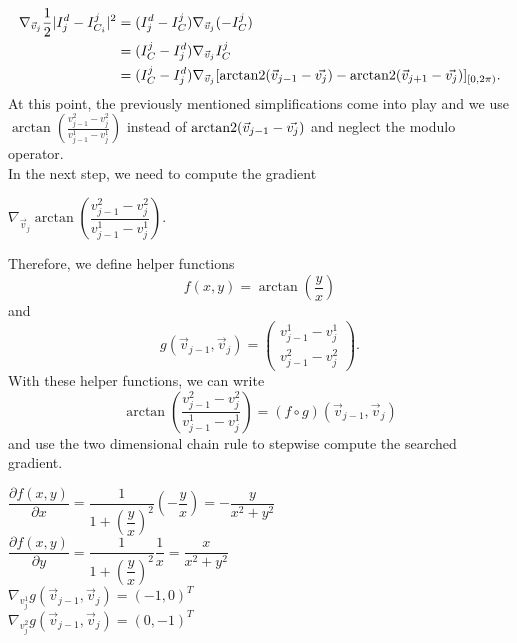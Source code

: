 \begin{proposition}
	\begin{align*}
		\nabla_{\vec{v}_j} \frac{1}{2}| I_{j}^d - I^{j}_{C_i} |^2 
		&= (I_{j}^d - I^j_{C}) \nabla_{\vec{v}_j} (- I^j_{C})\\
		&= (I^j_{C} - I_{j}^d) \nabla_{\vec{v}_j}  I^j_{C}   \\
		&= (I^j_{C} - I_{j}^d) \nabla_{\vec{v}_j} [\operatorname{arctan2}(\vec{v}_{j-1} - \vec{v_j}) - \operatorname{arctan2}(\vec{v}_{j+1} - \vec{v_j})]_{[0,2\pi)}.
	\end{align*}
	At this point, the previously mentioned simplifications come into play and we use $\arctan \left(\frac{v_{j-1}^2 - v_{j}^2}{v_{j-1}^1 - v_{j}^1} \right)$ instead of $\operatorname{arctan2}(\vec{v}_{j-1} - \vec{v_j})$ and neglect the modulo operator. \\
	In the next step, we need to compute the gradient 
	\begin{center}
		$
		\nabla_{\vec{v}_j} \arctan \left(\dfrac{v_{j-1}^2 - v_{j}^2}{v_{j-1}^1 - v_{j}^1} \right).
		$
	\end{center}
	
	Therefore, we define helper functions 
	$$ f(x,y) = \arctan \left( \frac{y}{x} \right)$$ 
	and 
	$$g(\vec{v}_{j-1}, \vec{v}_{j}) = \begin{pmatrix}
		v_{j-1}^1 - v_{j}^1 \\[0.5em] 
		v_{j-1}^2 - v_{j}^2
	\end{pmatrix}.$$
	With these helper functions, we can write 
	$$ \arctan\left(\frac{v_{j-1}^2 - v_{j}^2}{v_{j-1}^1 - v_{j}^1}\right) = (f \circ g) (\vec{v}_{j-1}, \vec{v}_{j}) $$
	and use the two dimensional chain rule to stepwise compute the searched gradient. 
 
	\begin{center}
		
		$\dfrac{\partial f(x,y)}{\partial x} = \dfrac{1}{1 + \left(\dfrac{y}{x}\right)^2} \left(- \dfrac{y}{x}\right) = - \dfrac{y}{x^2 + y^2}$ \\
		$\dfrac{\partial f(x,y)}{\partial y} = \dfrac{1}{1 + \left(\dfrac{y}{x}\right)^2}  \dfrac{1}{x} =  \dfrac{x}{x^2 + y^2}$ \\ [0.5em]

		$ \nabla_{v_j^1} g(\vec{v}_{j-1}, \vec{v}_{j}) = (-1, 0)^T$ \\
		$ \nabla_{v_j^2} g(\vec{v}_{j-1}, \vec{v}_{j}) = (0, -1)^T$ 
	
	\end{center}


\end{proposition}
